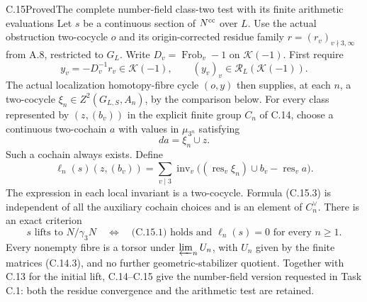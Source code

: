 \begin{statement}{C.15}{Proved}{The complete number-field class-two test with its finite arithmetic evaluations}
Let $s$ be a continuous section of $N^{\rm cc}$ over $L$.
Use the actual obstruction two-cocycle $o$ and its
origin-corrected residue family $r=(r_v)_{v\nmid3,\infty}$
from A.8, restricted to $G_L$. Write
$D_v=\operatorname{Frob}_v-1$ on $\mathcal K(-1)$.
First require
\[
 y_v=-D_v^{-1}r_v\in\mathcal K(-1),\qquad
 (y_v)_v\in\mathcal R_L(\mathcal K(-1)).                    \tag{C.15.1}
\]
The actual localization homotopy-fibre cycle $(o,y)$
then supplies, at each $n$, a two-cocycle
$\xi_n\in Z^2(G_{L,S},A_n)$, by the comparison below.
For every class represented by $(z,(b_v))$ in the
explicit finite group $C_n$ of C.14, choose a continuous
two-cochain $a$ with values in $\mu_{3^n}$ satisfying
\[
                        da=\xi_n\cup z.                    \tag{C.15.2}
\]
Such a cochain always exists. Define
\[
 \ell_n(s)(z,(b_v))
   =\sum_{v\mid3}\operatorname{inv}_v
       \bigl((\operatorname{res}_v\xi_n)\cup b_v
                          -\operatorname{res}_v a\bigr).
                                                               \tag{C.15.3}
\]
The expression in each local invariant is a two-cocycle.
Formula (C.15.3) is independent of all the auxiliary
cochain choices and is an element of $C_n^\vee$.
There is an exact criterion
\[
 s\text{ lifts to }N/\gamma_3N
 \quad\Longleftrightarrow\quad
 \text{(C.15.1) holds and }
        \ell_n(s)=0\text{ for every }n\ge1.                 \tag{C.15.4}
\]
Every nonempty fibre is a torsor under
$\varprojlim_n U_n$, with $U_n$ given by the finite
matrices (C.14.3), and no further geometric-stabilizer
quotient. Together with C.13 for the initial lift,
C.14--C.15 give the number-field version requested
in Task C.1: both the residue convergence and the
arithmetic test are retained.
\end{statement}
